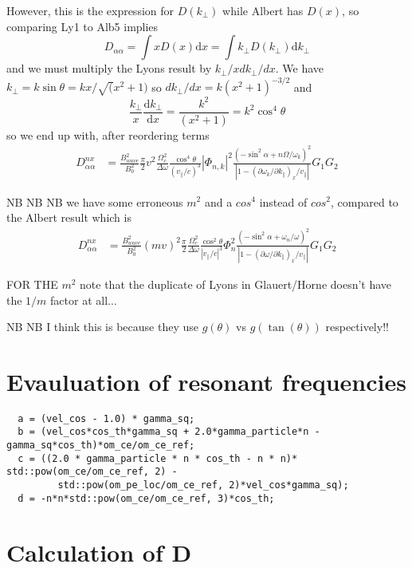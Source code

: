 \documentclass[]{article}
\begin{document}
However, this is the expression for $D(k_\perp)$ while Albert has $D(x)$, so comparing Ly1 to Alb5 implies
\begin{equation}
D_{\alpha\alpha} = \int x D(x) \mathrm{d}x = \int k_\perp D(k_\perp) \mathrm{d} k_\perp
\end{equation}
and we must multiply the Lyons result by $k_\perp/x dk_\perp/dx$. 
We have $k_\perp = k \sin \theta = k x /\sqrt(x^2 +1)$ so $dk_\perp/dx = k (x^2+1)^{-3/2}$ and
\[ \frac{k_\perp}{x}\frac{\mathrm{d} k_\perp}{\mathrm{d} x} = \frac{k^2}{(x^2+1)}  = k^2 \cos^4\theta\]
so we end up with, after reordering terms
\begin{align}\label{LyEnd}
D_{\alpha\alpha}^{nx} &= \frac{B^2_{wave}}{B_0^2} \frac{\pi}{2} v^2 \frac{ \Omega_c^2 }{\Delta \omega}\frac{\cos^4\theta}{(v_\parallel/c)^3} |\Phi_{n,k}|^2 \frac{ (-\sin^2\alpha + n \Omega/\omega_k)^2}{ |1-(\partial \omega_k/\partial k_\parallel)_x/v_\parallel|} G_1 G_2
\end{align}

NB NB NB we have some erroneous $m^2$ and a $cos^4$ instead of $cos^2$, compared to the Albert result which is
\begin{align}
D_{\alpha\alpha}^{nx} &= \frac{B_{wave}^2}{B_0^2}(mv)^2 \frac{\pi}{2}\frac{\Omega_c^2}{\Delta\omega}\frac{\cos^2\theta}{|v_\parallel/c|^3}  \Phi_n^2 \frac{(-\sin^2\alpha + \omega_n/\omega)^2}{|1-(\partial \omega/\partial k_\parallel)_x/v_\parallel|} G_1 G_2 \end{align}

FOR THE $m^2$ note that the duplicate of Lyons in Glauert/Horne doesn't have the $1/m$ factor at all...

NB NB I think this is because they use $g(\theta)$ vs $g(\tan(\theta))$ respectively!!

\section{Evauluation of resonant frequencies}

\begin{verbatim}
  a = (vel_cos - 1.0) * gamma_sq;
  b = (vel_cos*cos_th*gamma_sq + 2.0*gamma_particle*n - gamma_sq*cos_th)*om_ce/om_ce_ref;
  c = ((2.0 * gamma_particle * n * cos_th - n * n)* std::pow(om_ce/om_ce_ref, 2) - 
         std::pow(om_pe_loc/om_ce_ref, 2)*vel_cos*gamma_sq);
  d = -n*n*std::pow(om_ce/om_ce_ref, 3)*cos_th;
\end{verbatim}

\section{Calculation of D}
\end{document}
